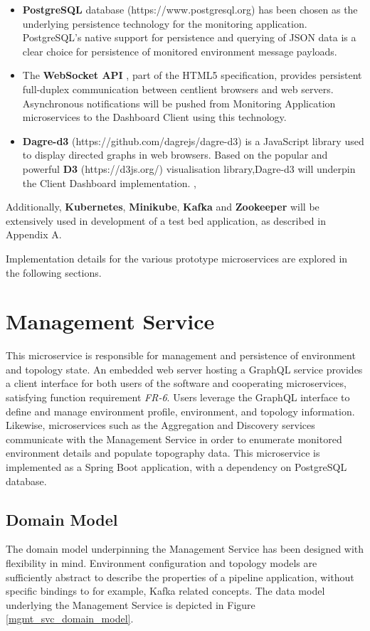 \begin{itemize}
	\item \textbf{PostgreSQL} database (https://www.postgresql.org) has been chosen as the underlying persistence technology for the monitoring application. PostgreSQL's native support for persistence and querying of JSON data is a clear choice for persistence of monitored environment message payloads.
	
	\item The \textbf{WebSocket API} \cite{TheWebSo73:online}, part of the HTML5 specification, provides persistent full-duplex communication between centlient browsers and web servers. Asynchronous notifications will be pushed from Monitoring Application microservices to the Dashboard Client using this technology.
	
	\item \textbf{Dagre-d3} (https://github.com/dagrejs/dagre-d3) is a JavaScript library used to display directed graphs in web browsers. Based on the popular and powerful \textbf{D3} (https://d3js.org/) visualisation library,Dagre-d3 will underpin the Client Dashboard implementation.
	,
\end{itemize}

Additionally, \textbf{Kubernetes}, \textbf{Minikube},  \textbf{Kafka} and  \textbf{Zookeeper} will be extensively used in development of a test bed application, as described in Appendix A.

Implementation details for the various prototype microservices are explored in the following sections.

\section{Management Service}

This microservice is responsible for management and persistence of environment and topology state. An embedded web server hosting a GraphQL service provides a client interface for both users of the software and cooperating microservices, satisfying function requirement \textit{FR-6}. Users leverage the GraphQL interface to define and manage environment profile, environment, and topology information. Likewise, microservices such as the Aggregation and Discovery services communicate with the Management Service in order to enumerate monitored environment details and populate topography data. This microservice is implemented as a Spring Boot application, with a dependency on PostgreSQL database.

\subsection{Domain Model} \label{management_service_domain_model}
The domain model underpinning the Management Service has been designed with flexibility in mind. Environment configuration and topology models are sufficiently abstract to describe the properties of a pipeline application, without specific bindings to for example, Kafka related concepts. The data model underlying the Management Service is depicted in Figure \ref{mgmt_svc_domain_model}.


